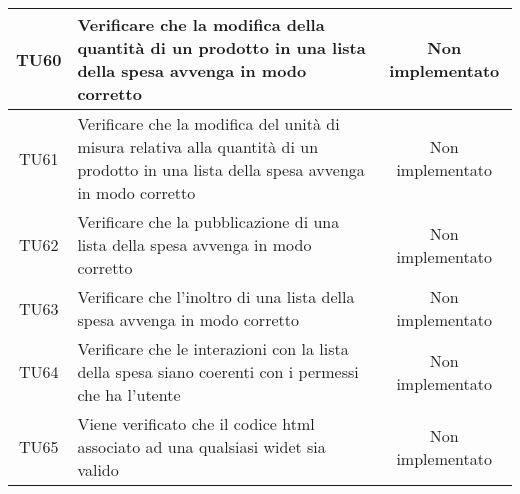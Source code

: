 \begin{center}
\begin{longtable}{|c|>{\centering}m{10cm}|c|}
		TU60 & Verificare che la modifica della quantità di un prodotto in una lista della spesa avvenga in modo corretto & Non implementato \\ \hline
		TU61 & Verificare che la modifica del unità di misura relativa alla quantità di un prodotto in una lista della spesa avvenga in modo corretto & Non implementato \\ \hline
		TU62 & Verificare che la pubblicazione di una lista della spesa avvenga in modo corretto & Non implementato \\ \hline
		TU63 & Verificare che l'inoltro di una lista della spesa avvenga in modo corretto & Non implementato \\ \hline
		TU64 & Verificare che le interazioni con la lista della spesa siano coerenti con i permessi che ha l'utente & Non implementato \\ \hline
		TU65 & Viene verificato che il codice html associato ad una qualsiasi widet sia valido & Non implementato \\ \hline
	\end{longtable}
\end{center}
